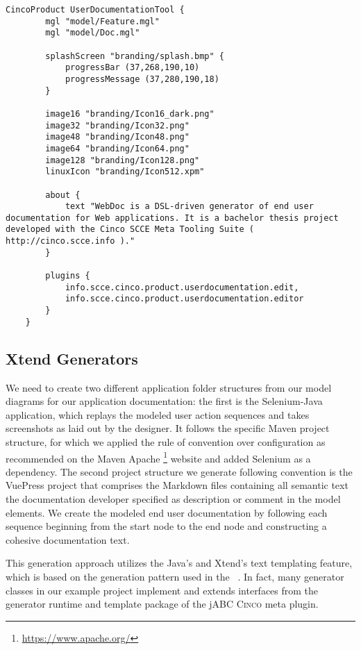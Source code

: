 \begin{lstlisting}[language=MGL, caption={UserDocumentationTool.cpd}]
    CincoProduct UserDocumentationTool {
        mgl "model/Feature.mgl"
        mgl "model/Doc.mgl"
        
        splashScreen "branding/splash.bmp" {
            progressBar (37,268,190,10)
            progressMessage (37,280,190,18)
        }
    
        image16 "branding/Icon16_dark.png"
        image32 "branding/Icon32.png"
        image48 "branding/Icon48.png"
        image64 "branding/Icon64.png"
        image128 "branding/Icon128.png"
        linuxIcon "branding/Icon512.xpm"
	
        about {
            text "WebDoc is a DSL-driven generator of end user documentation for Web applications. It is a bachelor thesis project developed with the Cinco SCCE Meta Tooling Suite ( http://cinco.scce.info )."
        }

        plugins {
            info.scce.cinco.product.userdocumentation.edit,
            info.scce.cinco.product.userdocumentation.editor
        }
    }
\end{lstlisting}

\subsection{Xtend Generators}\label{sec:GEN}

We need to create two different application folder structures from our model diagrams for our application documentation: the first is the Selenium-Java application, which replays the modeled user action sequences and takes screenshots as laid out by the designer. It follows the specific Maven project structure, for which we applied the rule of convention over configuration as recommended on the Maven Apache \footnote[1]{\url{https://www.apache.org/}} website and added Selenium as a dependency. The second project structure we generate following convention is the VuePress project that comprises the Markdown files containing all semantic text the documentation developer specified as description or comment in the model elements. We create the modeled end user documentation by following each sequence beginning from the start node to the end node and constructing a cohesive documentation text.

This generation approach utilizes the Java's and Xtend's text templating feature, which is based on the generation pattern used in the ~\cite{model-driver-dev_jABC,jabc-home}. In fact, many generator classes in our example project implement and extends interfaces from the generator runtime and template package of the jABC \textsc{Cinco} meta plugin.

